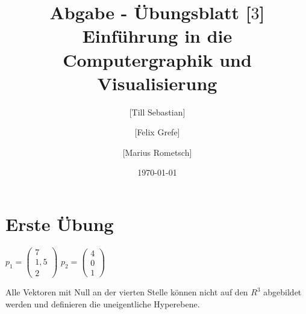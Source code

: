 \documentclass[10pt,a4paper]{article}
\begin{document}
\title{Abgabe - Übungsblatt [$3$]\\
\small{Einführung in die Computergraphik und Visualisierung}}
\author{ [Till Sebastian] \and [Felix Grefe] \and [Marius Rometsch]}
\date{\today}
\maketitle

\section*{Erste Übung}
$
p_1 =\begin{pmatrix}
	7 \\
	 1,5 \\
	 2 
\end{pmatrix}$
$
p_2 =\begin{pmatrix}
4 \\
0 \\
1 
\end{pmatrix}
$

Alle Vektoren mit Null an der vierten Stelle können nicht auf den $R^3$ abgebildet werden und definieren die uneigentliche Hyperebene.
\end{document}
